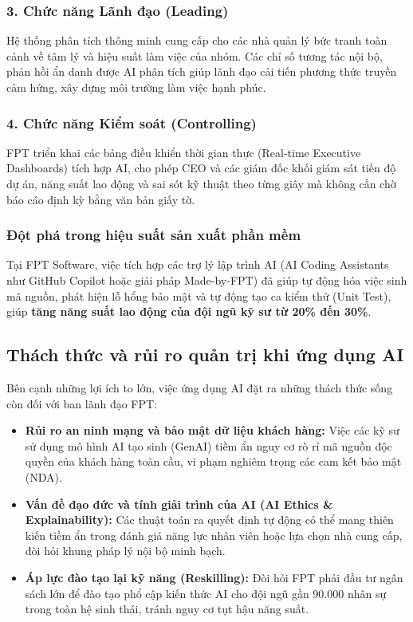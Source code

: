 \subsubsection{3. Chức năng Lãnh đạo (Leading)}
Hệ thống phân tích thông minh cung cấp cho các nhà quản lý bức tranh toàn cảnh về tâm lý và hiệu suất làm việc của nhóm. Các chỉ số tương tác nội bộ, phản hồi ẩn danh được AI phân tích giúp lãnh đạo cải tiến phương thức truyền cảm hứng, xây dựng môi trường làm việc hạnh phúc.

\subsubsection{4. Chức năng Kiểm soát (Controlling)}
FPT triển khai các bảng điều khiển thời gian thực (Real-time Executive Dashboards) tích hợp AI, cho phép CEO và các giám đốc khối giám sát tiến độ dự án, năng suất lao động và sai sót kỹ thuật theo từng giây mà không cần chờ báo cáo định kỳ bằng văn bản giấy tờ.

\subsubsection{Đột phá trong hiệu suất sản xuất phần mềm}
Tại FPT Software, việc tích hợp các trợ lý lập trình AI (AI Coding Assistants như GitHub Copilot hoặc giải pháp Made-by-FPT) đã giúp tự động hóa việc sinh mã nguồn, phát hiện lỗ hổng bảo mật và tự động tạo ca kiểm thử (Unit Test), giúp \textbf{tăng năng suất lao động của đội ngũ kỹ sư từ 20\% đến 30\%}.

\subsection{Thách thức và rủi ro quản trị khi ứng dụng AI}
Bên cạnh những lợi ích to lớn, việc ứng dụng AI đặt ra những thách thức sống còn đối với ban lãnh đạo FPT:
\begin{itemize}
    \item \textbf{Rủi ro an ninh mạng và bảo mật dữ liệu khách hàng:} Việc các kỹ sư sử dụng mô hình AI tạo sinh (GenAI) tiềm ẩn nguy cơ rò rỉ mã nguồn độc quyền của khách hàng toàn cầu, vi phạm nghiêm trọng các cam kết bảo mật (NDA).
    \item \textbf{Vấn đề đạo đức và tính giải trình của AI (AI Ethics \& Explainability):} Các thuật toán ra quyết định tự động có thể mang thiên kiến tiềm ẩn trong đánh giá năng lực nhân viên hoặc lựa chọn nhà cung cấp, đòi hỏi khung pháp lý nội bộ minh bạch.
    \item \textbf{Áp lực đào tạo lại kỹ năng (Reskilling):} Đòi hỏi FPT phải đầu tư ngân sách lớn để đào tạo phổ cập kiến thức AI cho đội ngũ gần 90.000 nhân sự trong toàn hệ sinh thái, tránh nguy cơ tụt hậu năng suất.
\end{itemize}
